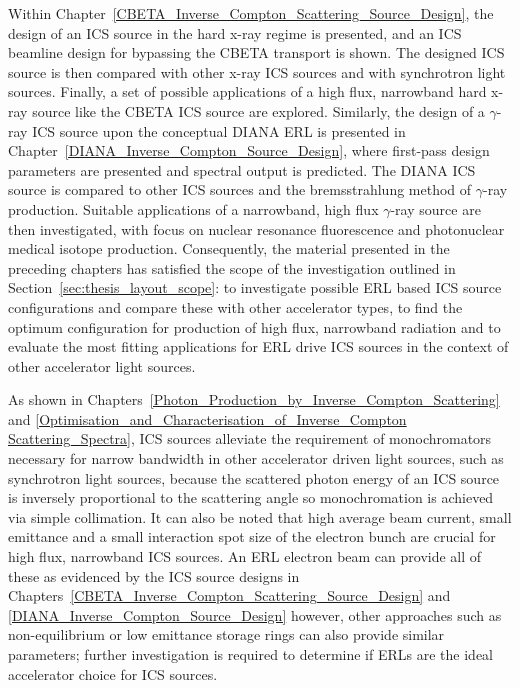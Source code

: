 \documentclass[../main.tex]{subfiles}
\begin{document}
Within Chapter~\ref{CBETA_Inverse_Compton_Scattering_Source_Design}, the design of an ICS source in the hard x-ray regime is presented, and an ICS beamline design for bypassing the CBETA transport is shown. The designed ICS source is then compared with other x-ray ICS sources and with synchrotron light sources. Finally, a set of possible applications of a high flux, narrowband hard x-ray source like the CBETA ICS source are explored. Similarly, the design of a $\gamma$-ray ICS source upon the conceptual DIANA ERL is presented in Chapter~\ref{DIANA_Inverse_Compton_Source_Design}, where first-pass design parameters are presented and spectral output is predicted. The DIANA ICS source is compared to other ICS sources and the bremsstrahlung method of $\gamma$-ray production. Suitable applications of a narrowband, high flux $\gamma$-ray source are then investigated, with focus on nuclear resonance fluorescence and photonuclear medical isotope production. Consequently, the material presented in the preceding chapters has satisfied the scope of the investigation outlined in Section~\ref{sec:thesis_layout_scope}: to investigate possible ERL based ICS source configurations and compare these with other accelerator types, to find the optimum configuration for production of high flux, narrowband radiation and to evaluate the most fitting applications for ERL drive ICS sources in the context of other accelerator light sources.

As shown in Chapters~\ref{Photon_Production_by_Inverse_Compton_Scattering} and \ref{Optimisation_and_Characterisation_of_Inverse_Compton Scattering_Spectra}, ICS sources alleviate the requirement of monochromators necessary for narrow bandwidth in other accelerator driven light sources, such as synchrotron light sources, because the scattered photon energy of an ICS source is inversely proportional to the scattering angle so monochromation is achieved via simple collimation. It can also be noted that high average beam current, small emittance and a small interaction spot size of the electron bunch are crucial for high flux, narrowband ICS sources. An ERL electron beam can provide all of these as evidenced by the ICS source designs in Chapters~\ref{CBETA_Inverse_Compton_Scattering_Source_Design} and \ref{DIANA_Inverse_Compton_Source_Design} however, other approaches such as non-equilibrium or low emittance storage rings can also provide similar parameters; further investigation is required to determine if ERLs are the ideal accelerator choice for ICS sources. 
\end{document}
